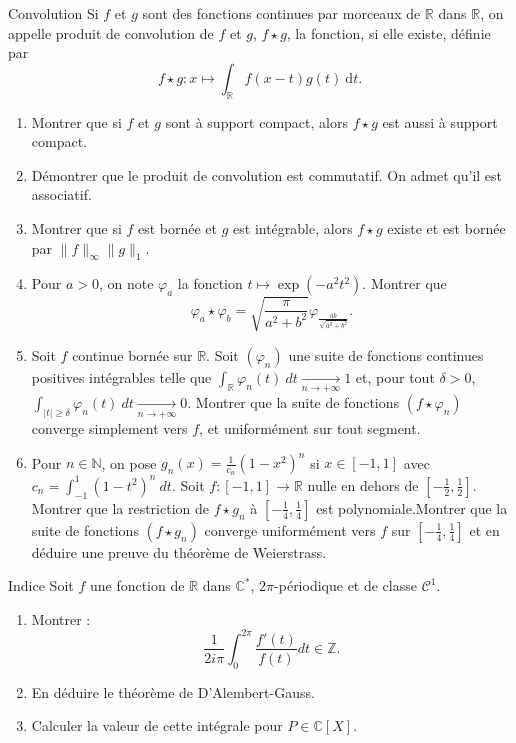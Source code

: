 \documentclass[french]{book}
\newcommand{\N}{\mathbb{N}}
\newcommand{\Z}{\mathbb{Z}}
\newcommand{\R}{\mathbb{R}}
\newcommand{\C}{\mathbb{C}}
\newcommand{\st}{^*}
\renewcommand{\d}{\text{d}}
\theoremstyle{definition}
\theoremstyle{remark}
\begin{document}
\begin{exo}[3]{Convolution}
	Si $f$ et $g$ sont des fonctions continues par morceaux de $\R$ dans $\R$, on appelle produit de convolution de $f$ et $g$, $f\star g$, la fonction, si elle existe, définie par $$f\star g:x\mapsto\displaystyle\int_\R f(x-t)g(t)\ \d t.$$
	\begin{enumerate}
		\item Montrer que si $f$ et $g$ sont à support compact, alors $f\star g$ est aussi à support compact.
		\item Démontrer que le produit de convolution est commutatif. On admet qu'il est associatif.
		\item Montrer que si $f$ est bornée et $g$ est intégrable, alors $f\star g$ existe et est bornée par $\lVert f\rVert_\infty\lVert g\rVert_1$.
		\item Pour $a>0$, on note $\varphi_a$ la fonction $t\mapsto\exp(-a^2t^2)$. Montrer que $$\varphi_a\star\varphi_b=\sqrt{\frac{\pi}{a^2+b^2}}\varphi_{\frac{ab}{\sqrt{a^2+b^2}}}.$$
		\item Soit $f$ continue bornée sur $\R$. Soit $(\varphi_n)$ une suite de fonctions continues positives intégrables telle que $\displaystyle\int_\R\varphi_n(t)\ dt\xrightarrow[n\to+\infty]{}1$ et, pour tout $\delta>0$, $\displaystyle\int_{\lvert t\rvert\geqslant \delta}\varphi_n(t)\ dt\xrightarrow[n\to+\infty]{}0$. Montrer que la suite de fonctions $(f\star\varphi_n)$ converge simplement vers $f$, et uniformément sur tout segment.
		\item Pour $n\in\N$, on pose $\displaystyle g_n(x)=\frac{1}{c_n}(1-x^2)^n$ si $x\in[-1,1]$ avec $c_n=\displaystyle\int_{-1}^{1}(1-t^2)^n\ dt$. Soit $f:[-1,1]\to\R$ nulle en dehors de $\displaystyle\left[-\frac{1}{2},\frac{1}{2}\right]$. Montrer que la restriction de $f\star g_n$ à $\displaystyle\left[-\frac{1}{4},\frac{1}{4}\right]$ est polynomiale.Montrer que la suite de fonctions $(f\star g_n)$ converge uniformément vers $f$ sur $\displaystyle\left[-\frac{1}{4},\frac{1}{4}\right]$ et en déduire une preuve du théorème de Weierstrass.
	\end{enumerate}
\end{exo}


\begin{exo}[3]{Indice}
	Soit $f$ une fonction de $\R$ dans $\C\st$, $2\pi$-périodique et de classe $\mathcal{C}^1$.
	\begin{enumerate}
		\item Montrer : $$\frac{1}{2i\pi}\int_{0}^{2\pi}\frac{f'(t)}{f(t)}dt\in\Z.$$
		\item En déduire le théorème de D'Alembert-Gauss.
		\item Calculer la valeur de cette intégrale pour $P\in\C[X]$.
	\end{enumerate}
\end{exo}
\end{document}
